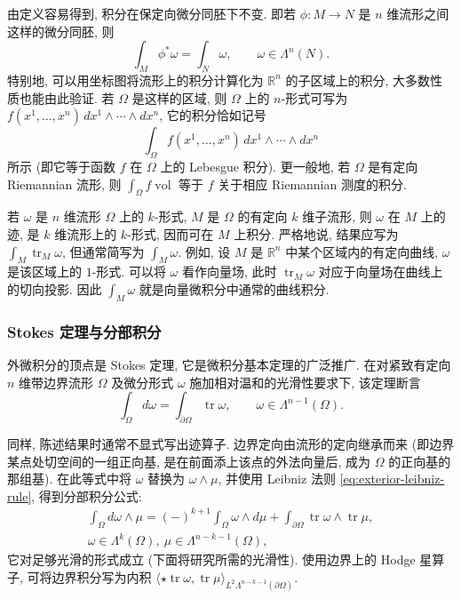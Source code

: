 {由定义容易得到, 积分在保定向微分同胚下不变. 即若 $\phi:M\to N$ 是 $n$ 维流形之间这样的微分同胚, 则}
\begin{equation}\label{eq:integration-pullback-invariance}
\int_M\phi^*\omega=\int_N\omega,\qquad\omega\in\Lambda^n(N).
\end{equation}
{特别地, 可以用坐标图将流形上的积分计算化为 $\mathbb R^n$ 的子区域上的积分, 大多数性质也能由此验证. 若 $\Omega$ 是这样的区域, 则 $\Omega$ 上的 $n$-形式可写为 $f(x^1,\ldots,x^n)\,dx^1\wedge\cdots\wedge dx^n$, 它的积分恰如记号}
\[
\int_\Omega f(x^1,\ldots,x^n)\,dx^1\wedge\cdots\wedge dx^n
\]
{所示 (即它等于函数 $f$ 在 $\Omega$ 上的 Lebesgue 积分). 更一般地, 若 $\Omega$ 是有定向 Riemannian 流形, 则 $\int_\Omega f\operatorname{vol}$ 等于 $f$ 关于相应 Riemannian 测度的积分.}

{若 $\omega$ 是 $n$ 维流形 $\Omega$ 上的 $k$-形式, $M$ 是 $\Omega$ 的有定向 $k$ 维子流形, 则 $\omega$ 在 $M$ 上的迹, 是 $k$ 维流形上的 $k$-形式, 因而可在 $M$ 上积分. 严格地说, 结果应写为 $\int_M\operatorname{tr}_M\omega$, 但通常简写为 $\int_M\omega$. 例如, 设 $M$ 是 $\mathbb R^n$ 中某个区域内的有定向曲线, $\omega$ 是该区域上的 $1$-形式. 可以将 $\omega$ 看作向量场, 此时 $\operatorname{tr}_M\omega$ 对应于向量场在曲线上的切向投影. 因此 $\int_M\omega$ 就是向量微积分中通常的曲线积分.}

\subsubsection{{Stokes 定理与分部积分}}\label{subsec:stokes-integration-by-parts}

{外微积分的顶点是 Stokes 定理, 它是微积分基本定理的广泛推广. 在对紧致有定向 $n$ 维带边界流形 $\Omega$ 及微分形式 $\omega$ 施加相对温和的光滑性要求下, 该定理断言}
\[
\int_\Omega d\omega=\int_{\partial\Omega}\operatorname{tr}\omega,\qquad\omega\in\Lambda^{n-1}(\Omega).
\]

{同样, 陈述结果时通常不显式写出迹算子. 边界定向由流形的定向继承而来 (即边界某点处切空间的一组正向基, 是在前面添上该点的外法向量后, 成为 $\Omega$ 的正向基的那组基).}
{在此等式中将 $\omega$ 替换为 $\omega\wedge\mu$, 并使用 Leibniz 法则 \eqref{eq:exterior-leibniz-rule}, 得到分部积分公式:}
\begin{equation}\label{eq:differential-forms-integration-by-parts}
\begin{gathered}
\int_\Omega d\omega\wedge\mu=(-)^{k+1}\int_\Omega\omega\wedge d\mu+\int_{\partial\Omega}\operatorname{tr}\omega\wedge\operatorname{tr}\mu,\\
\omega\in\Lambda^k(\Omega),\ \mu\in\Lambda^{n-k-1}(\Omega),
\end{gathered}
\end{equation}
{它对足够光滑的形式成立 (下面将研究所需的光滑性). 使用边界上的 Hodge 星算子, 可将边界积分写为内积 $\langle\star\operatorname{tr}\omega,\operatorname{tr}\mu\rangle_{L^2\Lambda^{n-k-1}(\partial\Omega)}$.}

